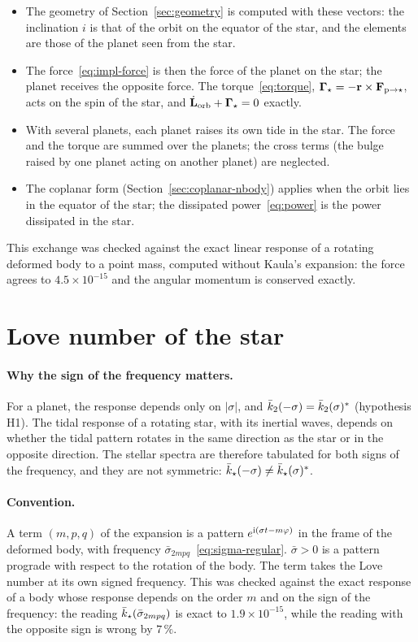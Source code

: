 \begin{itemize}
  \item The geometry of Section~\ref{sec:geometry} is computed with these vectors: the inclination $i$ is that of the orbit on the equator of the star, and the elements are those of the planet seen from the star.
  \item The force~\eqref{eq:impl-force} is then the force of the planet on the star; the planet receives the opposite force. The torque~\eqref{eq:torque}, $\boldsymbol\Gamma_\star=-\mathbf r\times\mathbf F_{{\rm p}\to\star}$, acts on the spin of the star, and $\dot{\mathbf L}_{\rm orb}+\boldsymbol\Gamma_\star=0$ exactly.
  \item With several planets, each planet raises its own tide in the star. The force and the torque are summed over the planets; the cross terms (the bulge raised by one planet acting on another planet) are neglected.
  \item The coplanar form (Section~\ref{sec:coplanar-nbody}) applies when the orbit lies in the equator of the star; the dissipated power~\eqref{eq:power} is the power dissipated in the star.
\end{itemize}
This exchange was checked against the exact linear response of a rotating deformed body to a point mass, computed without Kaula's expansion: the force agrees to $4.5\times10^{-15}$ and the angular momentum is conserved exactly.

\section{Love number of the star}\label{sec:star-spectrum}
\paragraph{Why the sign of the frequency matters.} For a planet, the response depends only on $|\sigma|$, and $\bar k_2(-\sigma)=\bar k_2(\sigma)^*$ (hypothesis H1). The tidal response of a rotating star, with its inertial waves, depends on whether the tidal pattern rotates in the same direction as the star or in the opposite direction. The stellar spectra are therefore tabulated for both signs of the frequency, and they are not symmetric: $\bar k_\star(-\sigma)\neq\bar k_\star(\sigma)^*$.

\paragraph{Convention.} A term $(m,p,q)$ of the expansion is a pattern $e^{\mathrm{i}(\sigma t-m\varphi)}$ in the frame of the deformed body, with frequency $\bar\sigma_{2mpq}$~\eqref{eq:sigma-regular}. $\bar\sigma>0$ is a pattern prograde with respect to the rotation of the body. The term takes the Love number at its own signed frequency. This was checked against the exact response of a body whose response depends on the order $m$ and on the sign of the frequency: the reading $\bar k_\star(\bar\sigma_{2mpq})$ is exact to $1.9\times10^{-15}$, while the reading with the opposite sign is wrong by $7\,\%$.

